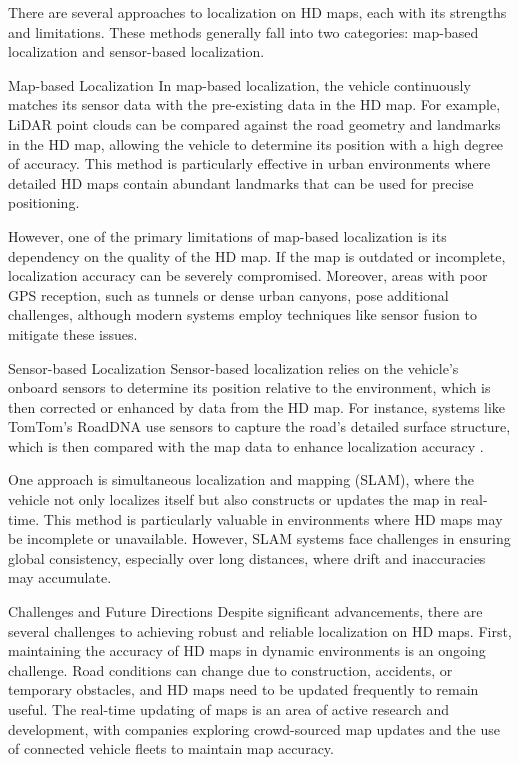 There are several approaches to localization on HD maps, each with its strengths and limitations. These methods generally fall into two categories: map-based localization and sensor-based localization.

Map-based Localization
In map-based localization, the vehicle continuously matches its sensor data with the pre-existing data in the HD map. For example, LiDAR point clouds can be compared against the road geometry and landmarks in the HD map, allowing the vehicle to determine its position with a high degree of accuracy. This method is particularly effective in urban environments where detailed HD maps contain abundant landmarks that can be used for precise positioning.

However, one of the primary limitations of map-based localization is its dependency on the quality of the HD map. If the map is outdated or incomplete, localization accuracy can be severely compromised. Moreover, areas with poor GPS reception, such as tunnels or dense urban canyons, pose additional challenges, although modern systems employ techniques like sensor fusion to mitigate these issues.

Sensor-based Localization
Sensor-based localization relies on the vehicle’s onboard sensors to determine its position relative to the environment, which is then corrected or enhanced by data from the HD map. For instance, systems like TomTom’s RoadDNA use sensors to capture the road's detailed surface structure, which is then compared with the map data to enhance localization accuracy .

One approach is simultaneous localization and mapping (SLAM), where the vehicle not only localizes itself but also constructs or updates the map in real-time. This method is particularly valuable in environments where HD maps may be incomplete or unavailable. However, SLAM systems face challenges in ensuring global consistency, especially over long distances, where drift and inaccuracies may accumulate.

Challenges and Future Directions
Despite significant advancements, there are several challenges to achieving robust and reliable localization on HD maps. First, maintaining the accuracy of HD maps in dynamic environments is an ongoing challenge. Road conditions can change due to construction, accidents, or temporary obstacles, and HD maps need to be updated frequently to remain useful. The real-time updating of maps is an area of active research and development, with companies exploring crowd-sourced map updates and the use of connected vehicle fleets to maintain map accuracy.

